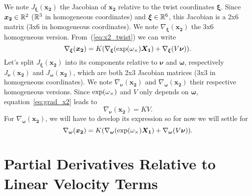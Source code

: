 We note $J_{\bm{\xi}} (\bm{x_2})$ the Jacobian of $\bm{x_2}$ relative to the twist coordinates $\bm{\xi}$.
Since $\bm{x_2} \in \mathbb{R}^2$ ($\mathbb{R}^3$ in homogeneous coordinates) and $\bm{\xi} \in \mathbb{R}^6$,
this Jacobian is a 2x6 matrix (3x6 in homogeneous coordinates).
We note $\nabla_{\bm{\xi}} (\bm{x_2})$ the 3x6 homogeneous version.
From~(\ref{eq:x2_twist}) we can write
\begin{equation}
\label{eq:grad_x2}
	\nabla_{\bm{\xi}} (\bm{x_2})
		= K (\nabla_{\bm{\xi}} (\exp({\omega}_{\times}) \bm{X_1} ) + \nabla_{\bm{\xi}} (V \bm{\nu})).
\end{equation}
Let's split $J_{\bm{\xi}} (\bm{x_2})$ into its components relative to $\bm{\nu}$ and $\bm{\omega}$,
respectively $J_{\bm{\nu}}(\bm{x_2})$ and $J_{\bm{\omega}}(\bm{x_2})$,
which are both 2x3 Jacobian matrices (3x3 in homogeneous coordinates).
We note $\nabla_{\bm{\nu}}(\bm{x_2})$ and $\nabla_{\bm{\omega}}(\bm{x_2})$
their respective homogeneous versions.
Since $\exp({\omega}_{\times})$ and $V$ only depends on $\bm{\omega}$,
equation~\ref{eq:grad_x2} leads to
\begin{equation}
\label{eq:grad_x2_nu}
	\nabla_{\bm{\nu}}(\bm{x_2}) = K V.
\end{equation}
For $\nabla_{\bm{\omega}}(\bm{x_2})$, we will have to develop its expression
so for now we will settle for
\begin{equation}
\label{eq:grad_x2_w}
	\nabla_{\bm{\omega}}(\bm{x_2})
		= K (\nabla_{\bm{\omega}} (\exp({\omega}_{\times}) \bm{X_1} ) + \nabla_{\bm{\omega}} (V \bm{\nu})).
\end{equation}


\section{Partial Derivatives Relative to Linear Velocity Terms}%
\label{sec:partial_derivatives_relative_to_linear_velocity_terms}

